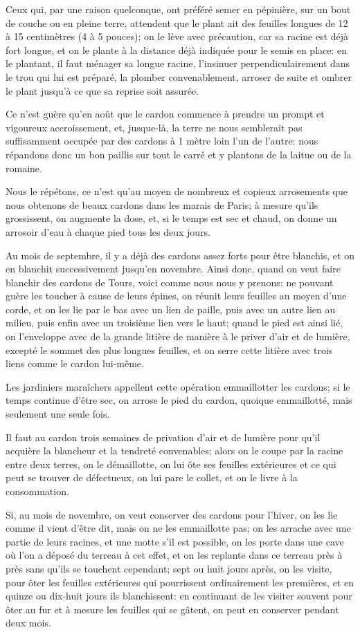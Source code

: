 \documentclass[10pt,a4paper]{book}
\begin{document}
Ceux qui, par une raison quelconque, ont préféré semer en pépinière, sur un bout de couche ou en pleine terre, attendent que le plant ait des feuilles longues de 12 à 15 centimètres (4 à 5 pouces); on le lève avec précaution, car sa racine est déjà fort longue, et on le plante à la distance déjà indiquée pour le semis en place: en le plantant, il faut ménager sa longue racine, l'insinuer perpendiculairement dans le trou qui lui est préparé, la plomber convenablement, arroser de suite et ombrer le plant jusqu'à ce que sa reprise soit assurée.

Ce n'est guère qu'en août que le cardon commence à prendre un prompt et vigoureux accroissement, et, jusque-là, la terre ne nous semblerait pas suffisamment occupée par des cardons à 1 mètre loin l'un de l'autre: nous répandons donc un bon paillis sur tout le carré et y plantons de la laitue ou de la romaine.

Nous le répétons, ce n'est qu'au moyen de nombreux et copieux arrosements que nous obtenons de beaux cardons dans les marais de Paris; à mesure qu'ils grossissent, on augmente la dose, et, si le temps est sec et chaud, on donne un arrosoir d'eau à chaque pied tous les deux jours.

Au mois de septembre, il y a déjà des cardons assez forts pour être blanchis, et on en blanchit successivement jusqu'en novembre. Ainsi donc, quand on veut faire blanchir des cardons de Tours, voici comme nous nous y prenons: ne pouvant guère les toucher à cause de leurs épines, on réunit leurs feuilles au moyen d'une corde, et on les lie par le bas avec un lien de paille, puis avec un autre lien au milieu, puis enfin avec un troisième lien vers le haut; quand le pied est ainsi lié, on l'enveloppe avec de la grande litière de manière à le priver d'air et de lumière, excepté le sommet des plus longues feuilles, et on serre cette litière avec trois liens comme le cardon lui-même.

Les jardiniers maraîchers appellent cette opération emmaillotter les cardons; si le temps continue d'être sec, on arrose le pied du cardon, quoique emmaillotté, mais seulement une seule fois.

Il faut au cardon trois semaines de privation d'air et de lumière pour qu'il acquière la blancheur et la tendreté convenables; alors on le coupe par la racine entre deux terres, on le démaillotte, on lui ôte ses feuilles extérieures et ce qui peut se trouver de défectueux, on lui pare le collet, et on le livre à la consommation.

Si, au mois de novembre, on veut conserver des cardons pour l'hiver, on les lie comme il vient d'être dit, mais on ne les emmaillotte pas; on les arrache avec une partie de leurs racines, et une motte s'il est possible, on les porte dans une cave où l'on a déposé du terreau à cet effet, et on les replante dans ce terreau près à près sans qu'ils se touchent cependant; sept ou huit jours après, on les visite, pour ôter les feuilles extérieures qui pourrissent ordinairement les premières, et en quinze ou dix-huit jours ils blanchissent: en continuant de les visiter souvent pour ôter au fur et à mesure les feuilles qui se gâtent, on peut en conserver pendant deux mois.
\end{document}
